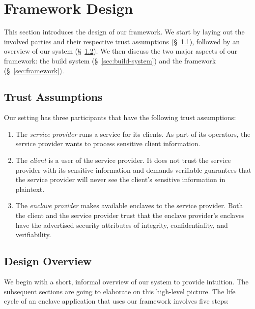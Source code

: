 \section{Framework Design}
\label{sec:design}

This section introduces the design of our framework.  We start by laying out the
involved parties and their respective trust assumptions
(\S~\ref{sec:trust-assumptions}), followed by an overview of our system
(\S~\ref{sec:overview}).  We then discuss the two major aspects of our
framework: the build system (\S~\ref{sec:build-system}) and the framework
(\S~\ref{sec:framework}).

\subsection{Trust Assumptions}
\label{sec:trust-assumptions}

Our setting has three participants that have the following trust assumptions:

\begin{enumerate}
    \item The \emph{service provider} runs a service for its clients.  As part
      of its operators, the service provider wants to process sensitive client
      information.

    \item The \emph{client} is a user of the service provider.  It does not
      trust the service provider with its sensitive information and demands
      verifiable guarantees that the service provider will never see the
      client's sensitive information in plaintext.

    \item The \emph{enclave provider} makes available enclaves to the service
      provider.  Both the client and the service provider trust that the enclave
      provider's enclaves have the advertised security attributes of integrity,
      confidentiality, and verifiability.
\end{enumerate}



\subsection{Design Overview}
\label{sec:overview}

We begin with a short, informal overview of our system to provide intuition.
The subsequent sections are going to elaborate on this high-level picture.
The life cycle of an enclave application that uses our framework involves five
steps:

